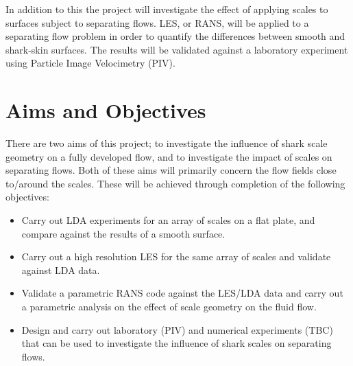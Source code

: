 \documentclass[12pt,oneside,a4paper]{article}
\begin{document}
In addition to this the project will investigate the effect of applying scales to surfaces subject to separating flows. LES, or RANS, will be applied to a separating flow problem in order to quantify the differences between smooth and shark-skin surfaces. The results will be validated against a laboratory experiment using Particle Image Velocimetry (PIV). 


\section{Aims and Objectives}
\label{section:AandO}

There are two aims of this project; to investigate the influence of shark scale geometry on a fully developed flow, and to investigate the impact of scales on separating flows. Both of these aims will primarily concern the flow fields close to/around the scales. These will be achieved through completion of the following objectives:
\begin{itemize}
\itemsep0em
\item Carry out LDA experiments for an array of scales on a flat plate, and compare against the results of a smooth surface.

\item Carry out a high resolution LES for the same array of scales and validate against LDA data. 

\item Validate a parametric RANS code against the LES/LDA data and carry out a parametric analysis on the effect of scale geometry on the fluid flow. 

\item Design and carry out laboratory (PIV) and numerical experiments (TBC) that can be used to investigate the influence of shark scales on separating flows.  
\end{itemize}


\newpage
\end{document}
